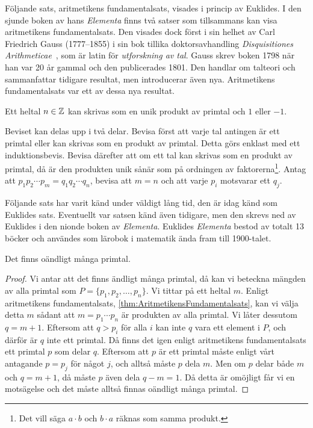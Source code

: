 Följande sats, aritmetikens fundamentalsats, visades i princip av Euklides.
I den sjunde boken av hans \emph{Elementa} finns två satser som tillsammans
kan visa aritmetikens fundamentalsats.
Den visades dock först i sin helhet av Carl Friedrich Gauss (1777--1855) i sin
bok tillika doktorsavhandling \emph{Disquisitiones 
  Arithmeticae}~\cite{Kline1990mtf3}, som är latin för \emph{utforskning av
tal}.
Gauss skrev boken 1798 när han var 20 år gammal och den publicerades 1801.
Den handlar om talteori och sammanfattar tidigare resultat, men introducerar
även nya.
Aritmetikens fundamentalsats var ett av dessa nya resultat.
\begin{theorem}\label{thm:AritmetikensFundamentalsats}
  Ett heltal \(n\in\mathbb{Z}\) kan skrivas som en unik produkt av primtal och \(1\)
  eller \(-1\).
\end{theorem}
\begin{exercise}
  Beviset kan delas upp i två delar.
  Bevisa först att varje tal antingen är ett primtal eller kan skrivas som en 
  produkt av primtal.
  Detta görs enklast med ett induktionsbevis.
  Bevisa därefter att om ett tal kan skrivas som en produkt av primtal, då är 
  den produkten unik sånär som på ordningen av faktorerna\footnote{%
    Det vill säga \(a\cdot b\) och \(b\cdot a\) räknas som samma produkt.
  }.
  Antag att \(p_1p_2\dotsb p_m = q_1q_2\dotsb q_n\), bevisa att \(m = n\) och 
  att varje \(p_i\) motsvarar ett \(q_j\).
\end{exercise}

Följande sats har varit känd under väldigt lång tid, den är idag känd som
Euklides sats.
Eventuellt var satsen känd även tidigare, men den skrevs ned av Euklides i
den nionde boken av \emph{Elementa}.
Euklides \emph{Elementa} bestod av totalt 13 böcker och användes som lärobok
i matematik ända fram till 1900-talet.
\begin{theorem}
  Det finns oändligt många primtal.
\end{theorem}
\begin{proof}
  Vi antar att det finns ändligt många primtal, då kan vi beteckna mängden av 
  alla primtal som \(P = \{p_1, p_2, \dotsc, p_n\}\).
  Vi tittar på ett heltal \(m\).
  Enligt aritmetikens fundamentalsats, 
  \cref{thm:AritmetikensFundamentalsats}, kan vi välja detta \(m\) sådant 
  att \(m = p_1\cdots p_n\) är produkten av alla primtal.
  Vi låter dessutom \(q=m+1\).
  Eftersom att \(q > p_i\) för alla \(i\) kan inte \(q\) vara ett element i
  \(P\), och därför är \(q\) inte ett primtal.
  Då finns det igen enligt aritmetikens fundamentalsats ett primtal \(p\) som 
  delar \(q\).
  Eftersom att \(p\) är ett primtal måste enligt vårt antagande \(p = p_j\) för 
  något \(j\), och alltså måste \(p\) dela \(m\).
  Men om \(p\) delar både \(m\) och \(q = m + 1\), då måste \(p\) även dela
  \(q - m = 1\).
  Då detta är omöjligt får vi en motsägelse och det måste alltså finnas
  oändligt många primtal.
\end{proof}


